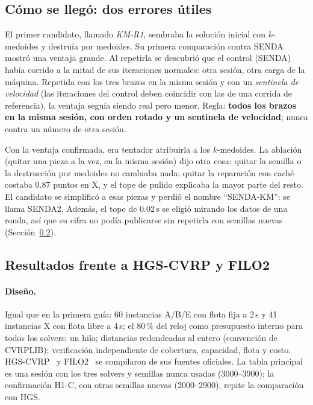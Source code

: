 \documentclass[11pt,a4paper]{article}
\newcommand{\senda}{SENDA}
\newcommand{\sendados}{SENDA2}
\begin{document}
\subsection{Cómo se llegó: dos errores útiles}

\begin{leccion}
El primer candidato, llamado \emph{KM-R1}, sembraba la solución inicial con $k$-medoides y destruía
por medoides. Su primera comparación contra \senda{} mostró una ventaja grande. Al repetirla se
descubrió que el control (\senda) había corrido a la mitad de sus iteraciones normales: otra sesión,
otra carga de la máquina. Repetida con los tres brazos en la misma sesión y con un \emph{sentinela de
velocidad} (las iteraciones del control deben coincidir con las de una corrida de referencia), la
ventaja seguía siendo real pero menor. Regla: \textbf{todos los brazos en la misma sesión, con orden
rotado y un sentinela de velocidad}; nunca contra un número de otra sesión.
\end{leccion}

\begin{leccion}
Con la ventaja confirmada, era tentador atribuirla a los $k$-medoides. La ablación (quitar una pieza
a la vez, en la misma sesión) dijo otra cosa: quitar la semilla o la destrucción por medoides no
cambiaba nada; quitar la reparación con caché costaba 0.87 puntos en X, y el tope de pulido explicaba
la mayor parte del resto. El candidato se simplificó a esas piezas y perdió el nombre ``SENDA-KM'':
se llama \sendados. Además, el tope de 0.02\,s se eligió mirando los datos de una ronda, así que su
cifra no podía publicarse sin repetirla con semillas nuevas (Sección~\ref{sec:confirmacion}).
\end{leccion}

\subsection{Resultados frente a HGS-CVRP y FILO2}
\label{sec:confirmacion}

\paragraph{Diseño.} Igual que en la primera guía: 60 instancias A/B/E con flota fija a 2\,s y 41
instancias X con flota libre a 4\,s; el 80\,\% del reloj como presupuesto interno para todos los
solvers; un hilo; distancias redondeadas al entero (convención de CVRPLIB); verificación
independiente de cobertura, capacidad, flota y costo. HGS-CVRP~\cite{vidal2022hgs} y
FILO2~\cite{accorsi2023} se compilaron de sus fuentes oficiales. La tabla principal es una sesión con
los tres solvers y semillas nunca usadas (3000--3900); la confirmación H1-C, con otras semillas nuevas
(2000--2900), repite la comparación con HGS.
\end{document}
